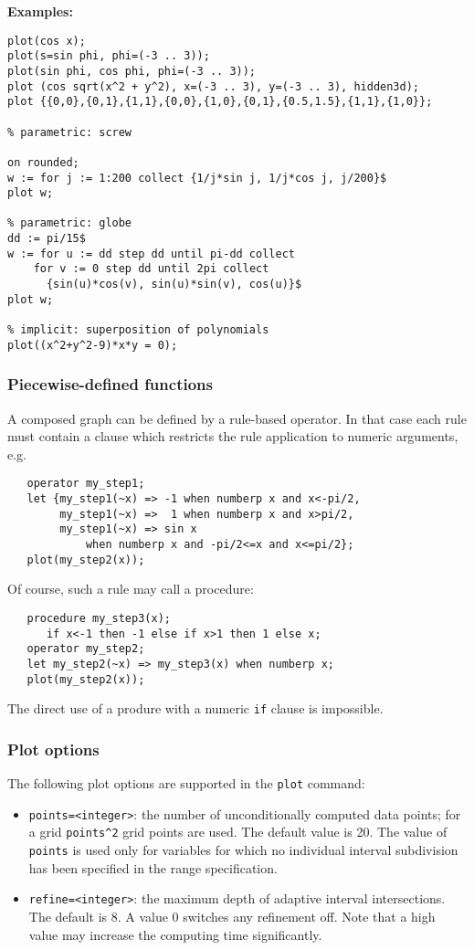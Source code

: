 \textbf{Examples:}
\begin{verbatim}
plot(cos x);
plot(s=sin phi, phi=(-3 .. 3));
plot(sin phi, cos phi, phi=(-3 .. 3));
plot (cos sqrt(x^2 + y^2), x=(-3 .. 3), y=(-3 .. 3), hidden3d);
plot {{0,0},{0,1},{1,1},{0,0},{1,0},{0,1},{0.5,1.5},{1,1},{1,0}};

% parametric: screw

on rounded;
w := for j := 1:200 collect {1/j*sin j, 1/j*cos j, j/200}$
plot w;

% parametric: globe
dd := pi/15$
w := for u := dd step dd until pi-dd collect
    for v := 0 step dd until 2pi collect
      {sin(u)*cos(v), sin(u)*sin(v), cos(u)}$
plot w;

% implicit: superposition of polynomials
plot((x^2+y^2-9)*x*y = 0);
\end{verbatim}


\subsubsection{Piecewise-defined functions}
A composed graph can be defined by a rule-based operator.  In that case each
rule must contain a clause which restricts the rule application to numeric
arguments, e.g.
\begin{verbatim}
   operator my_step1;
   let {my_step1(~x) => -1 when numberp x and x<-pi/2,
        my_step1(~x) =>  1 when numberp x and x>pi/2,
        my_step1(~x) => sin x
            when numberp x and -pi/2<=x and x<=pi/2};
   plot(my_step2(x));
\end{verbatim}
Of course, such a rule may call a procedure:
\begin{verbatim}
   procedure my_step3(x);
      if x<-1 then -1 else if x>1 then 1 else x;
   operator my_step2;
   let my_step2(~x) => my_step3(x) when numberp x;
   plot(my_step2(x));
\end{verbatim}
The direct use of a produre with a numeric \texttt{if} clause is impossible.

\subsubsection{Plot options}
The following plot options are supported in the \texttt{plot} command:
\begin{itemize}
   \item \texttt{points=<integer>}: the number of unconditionally computed data
     points; for a grid \texttt{points\^{}2} grid points are used.  The default
     value is 20. The value of \texttt{points} is used only for variables for
     which no individual interval subdivision has been specified in the range
     specification.
   \item \texttt{refine=<integer>}: the maximum depth of adaptive interval
     intersections. The default is 8. A value 0 switches any refinement
     off. Note that a high value may increase the computing time significantly.
\end{itemize}



